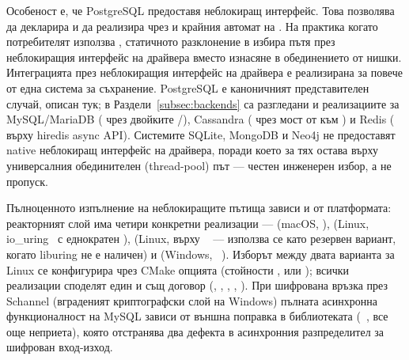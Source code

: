 Особеност е, че PostgreSQL предоставя неблокиращ интерфейс. Това позволява  да декларира  и да реализира  чрез  и крайния автомат на . На практика когато потребителят използва , статичното разклонение в  избира пътя през неблокиращия интерфейс на драйвера вместо изнасяне в обединението от нишки. Интеграцията през неблокиращия интерфейс на драйвера е реализирана за повече от една система за съхранение. PostgreSQL е каноничният представителен случай, описан тук; в Раздели~\ref{subsec:backends} са разгледани и реализациите за MySQL/MariaDB ( чрез двойките /), Cassandra ( чрез мост от  към ) и Redis ( върху hiredis async API). Системите SQLite, MongoDB и Neo4j не предоставят native неблокиращ интерфейс на драйвера, поради което за тях  остава върху универсалния обединителен (thread-pool) път --- честен инженерен избор, а не пропуск.

Пълноценното изпълнение на неблокиращите пътища зависи и от платформата: реакторният слой  има четири конкретни реализации ---  (macOS, ),  (Linux, io\_uring~\cite{io_uring} с еднократен ),  (Linux,  върху ~\cite{epoll_man} --- използва се като резервен вариант, когато liburing не е наличен) и  (Windows, ~\cite{iocp_msdn}). Изборът между двата варианта за Linux се конфигурира чрез CMake опцията  (стойности ,  или ); всички реализации споделят един и същ договор (, , , , ). При шифрована връзка през Schannel (вграденият криптографски слой на Windows) пълната асинхронна функционалност на MySQL зависи от външна поправка в библиотеката  (~\cite{mariadb_connector_c_pr_310}, все още неприета), която отстранява два дефекта в асинхронния разпределител за шифрован вход-изход.

